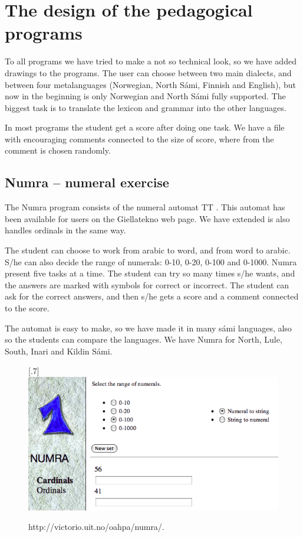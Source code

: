\documentclass[a4paper,12pt]{article}
\begin{document}
\section{The design of the pedagogical programs}
To all programs we have tried to make a not so technical look, so we have added drawings to the programs. The user can choose between two main dialects, and between four metalanguages (Norwegian, North Sámi, Finnish and English), but now in the beginning is only Norwegian and North Sámi fully supported. The biggest task is to translate the lexicon and grammar into the other languages.  

In most programs the student get a score after doing one task. We have a file with encouraging comments connected to the size of score, where from the comment is chosen randomly.

\subsection{Numra -- numeral exercise}
The Numra program consists of the numeral automat TT . This automat has been available for users on the Giellatekno web page. We have extended is also handles ordinals in the same way.  

The student can choose to work from arabic to word, and from word to arabic. S/he can also decide the range of numerals: 0-10, 0-20, 0-100 and 0-1000. Numra present five tasks at a time. The student can try so many times s/he wants, and the answers are marked with symbols for correct or incorrect. The student can ask for the correct answers, and then s/he gets a score and a comment connected to the score.

The automat is easy to make, so we have made it in many sámi languages, also so the students can compare the languages. We have Numra for North, Lule, South, Inari and Kildin Sámi.\\ 


\begin{figure}[htbp]
\begin{center}
\scalebox{.7}[.7]{\includegraphics{img/numra.png}}\\
\caption{http://victorio.uit.no/oahpa/numra/.}
\label{numra}
\end{center}
\end{figure}
\end{document}
